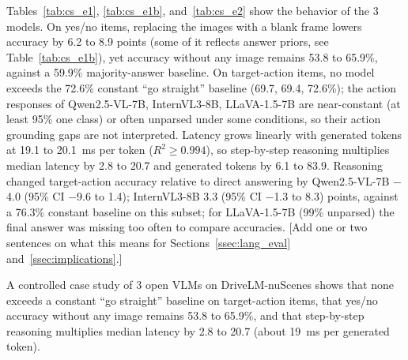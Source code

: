 Tables~\ref{tab:cs_e1}, \ref{tab:cs_e1b}, and~\ref{tab:cs_e2} show the behavior of the 3 models. On yes/no items, replacing the images with a blank frame lowers accuracy by 6.2 to 8.9 points (some of it reflects answer priors, see Table~\ref{tab:cs_e1b}), yet accuracy without any image remains 53.8 to 65.9\%, against a 59.9\% majority-answer baseline. On target-action items, no model exceeds the 72.6\% constant ``go straight'' baseline (69.7, 69.4, 72.6\%); the action responses of Qwen2.5-VL-7B, InternVL3-8B, LLaVA-1.5-7B are near-constant (at least 95\% one class) or often unparsed under some conditions, so their action grounding gaps are not interpreted. Latency grows linearly with generated tokens at 19.1 to 20.1~ms per token ($R^2\ge0.994$), so step-by-step reasoning multiplies median latency by 2.8 to 20.7 and generated tokens by 6.1 to 83.9. Reasoning changed target-action accuracy relative to direct answering by Qwen2.5-VL-7B $-$4.0 (95\% CI $-$9.6 to 1.4); InternVL3-8B 3.3 (95\% CI $-$1.3 to 8.3) points, against a 76.3\% constant baseline on this subset; for LLaVA-1.5-7B (99\% unparsed) the final answer was missing too often to compare accuracies. [Add one or two sentences on what this means for Sections~\ref{ssec:lang_eval} and~\ref{ssec:implications}.]

A controlled case study of 3 open VLMs on DriveLM-nuScenes shows that none exceeds a constant ``go straight'' baseline on target-action items, that yes/no accuracy without any image remains 53.8 to 65.9\%, and that step-by-step reasoning multiplies median latency by 2.8 to 20.7 (about 19~ms per generated token).
